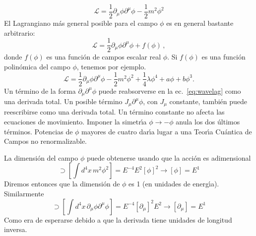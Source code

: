 \begin{equation}
  \label{eq:wavelagtrue}
  \mathcal{L}=\frac{1}{2}\partial_\mu\phi\partial^\mu\phi-\frac{1}{2}m^2\phi^2
\end{equation}
El Lagrangiano m\'as general posible para el campo $\phi$ es en general bastante arbitrario:
\begin{equation}
  \mathcal{L}=\frac{1}{2}\partial_\mu\phi\partial^\mu\phi+f(\phi)\,,
\end{equation}
donde $f(\phi)$ es una función de campos escalar real $\phi$. Si $f(\phi)$ es una función polinómica del campo $\phi$, tenemos por ejemplo.
\begin{equation}
  \label{eq:wavelag}
  \mathcal{L}=\frac{1}{2}\partial_\mu\phi\partial^\mu\phi-\frac{1}{2}m^2\phi^2+\frac{1}{4}\lambda\phi^4+a\phi+b\phi^3.
\end{equation}
Un t\'ermino de la forma $\partial_\mu\partial^\mu\phi$ puede reabsorverse en la
ec.~\eqref{eq:wavelag} como una derivada total. Un posible t\'ermino
$J_\mu\partial^\mu\phi$, con $J_\mu$ constante, tambi\'en puede reescribirse como una
derivada total. Un t\'ermino constante
no afecta las ecuaciones de movimiento. Imponer la simetr\'\i a $\phi\to-\phi$
anula los dos \'ultimos t\'erminos. Potencias de $\phi$ mayores de cuatro
dar\'\i a lugar a una Teor\'\i a Cu\'antica de Campos no renormalizable. 

La dimensi\'on del campo $\phi$ puede obtenerse usando que la acci\'on es adimensional
\begin{equation}
  [S]\supset\left[\int d^4x\,m^2\phi^2\right]=E^{-4}E^2[\phi]^2\to [\phi]=E^1
\end{equation}
Diremos entonces que la dimensi\'on de $\phi$ es 1 (en unidades de energ\'\i a). Similarmente
\begin{equation}
  [S]\supset\left[\int d^4x\,\partial_\mu\phi\partial^\mu\phi\right]=E^{-4}[\partial_\mu]^2E^2\to [\partial_\mu]=E^1
\end{equation}
Como era de esperarse debido a que la derivada tiene unidades de longitud inversa.

